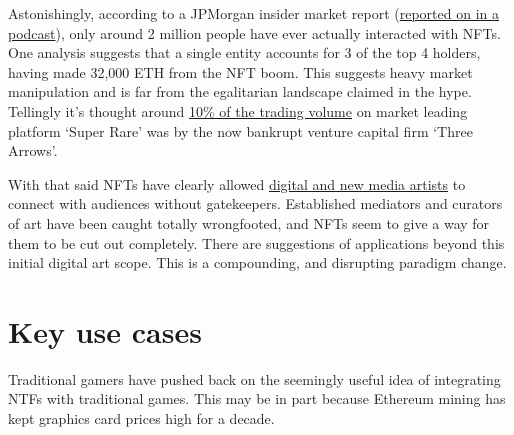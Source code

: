 Astonishingly, according to a JPMorgan insider market report (\href{https://www.coindesk.com/podcasts/the-breakdown-with-nlw/jpmorgan-bitcoin-shows-some-merit-as-a-store-of-value/}{reported on in a podcast}), only around 2 million people have ever actually interacted with NFTs. One analysis suggests that a single entity accounts for 3 of the top 4 holders, having made 32,000 ETH from the NFT boom. This suggests heavy market manipulation and is far from the egalitarian landscape claimed in the hype. Tellingly it's thought around \href{https://uk.finance.yahoo.com/news/three-arrows-wanted-100m-nft-161811450.html}{10\% of the trading volume} on market leading platform `Super Rare' was by the now bankrupt venture capital firm `Three Arrows'. \par
With that said NFTs have clearly allowed \href{https://en.wikipedia.org/wiki/List_of_most_expensive_non-fungible_tokens}{digital and new media artists} to connect with audiences without gatekeepers. Established mediators and curators of art have been caught totally wrongfooted, and NFTs seem to give a way for them to be cut out completely. There are suggestions of applications beyond this initial digital art scope. This is a compounding, and disrupting paradigm change.\par
\section{Key use cases}

Traditional gamers have pushed back on the seemingly useful idea of integrating NTFs with traditional games. This may be in part because Ethereum mining has kept graphics card prices high for a decade.

